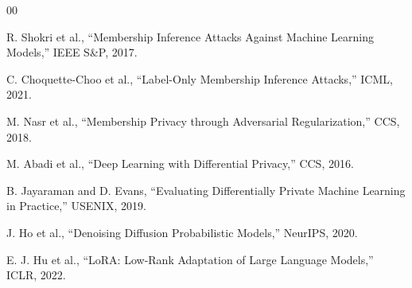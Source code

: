 \documentclass[conference]{IEEEtran}
\begin{document}
\begin{thebibliography}{00}

R. Shokri et al., ``Membership Inference Attacks Against Machine Learning Models,'' IEEE S\&P, 2017.

C. Choquette-Choo et al., ``Label-Only Membership Inference Attacks,'' ICML, 2021.

M. Nasr et al., ``Membership Privacy through Adversarial Regularization,'' CCS, 2018.

M. Abadi et al., ``Deep Learning with Differential Privacy,'' CCS, 2016.

B. Jayaraman and D. Evans, ``Evaluating Differentially Private Machine Learning in Practice,'' USENIX, 2019.

J. Ho et al., ``Denoising Diffusion Probabilistic Models,'' NeurIPS, 2020.

E. J. Hu et al., ``LoRA: Low-Rank Adaptation of Large Language Models,'' ICLR, 2022.
\end{thebibliography}
\end{document}
